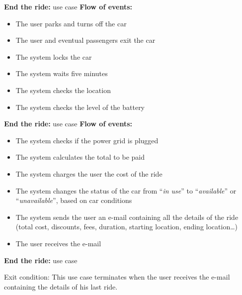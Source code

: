 \documentclass{beamer}
\begin{document}
	\begin{frame} {\textbf{End the ride:} use case}
		\textbf{Flow of events:}\\
		\begin{itemize} 
			\item The user parks and turns off the car
			\item The user and eventual passengers exit the car
			\item The system locks the car
			\item The system waits five minutes
			\item The system checks the location
			\item The system checks the level of the battery
		\end{itemize}
	\end{frame}

	\begin{frame} {\textbf{End the ride:} use case}
		\textbf{Flow of events:}\\
		\begin{itemize} 
			\item The system checks if the power grid is plugged
			\item The system calculates the total to be paid
			\item The system charges the user the cost of the ride
			\item The system changes the status of the car from ``\textit{in use}'' to ``\textit{available}'' or ``\textit{unavailable}'', based on  car conditions
			\item The system sends the user an e-mail containing all the details of the ride (total cost, discounts, fees, duration, starting location, ending location\ldots)
			\item The user receives the e-mail
		\end{itemize}
	\end{frame}
	
	\begin{frame}{\textbf{End the ride:} use case}
		\begin{block}{Exit condition:}
			This use case terminates when the user receives the e-mail containing the details of his last ride.
		\end{block}
	\end{frame}
\end{document}
